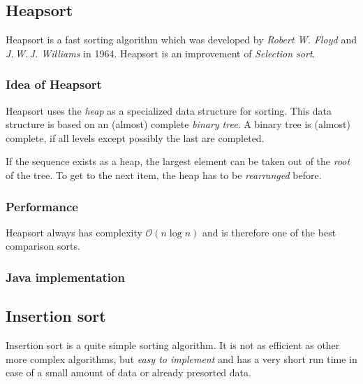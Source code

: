 \documentclass[]{pfBook}
\newcommand{\OO}{\mathcal{O}}
\begin{document}
	
	
	\subsection{Heapsort}
	
	Heapsort is a fast sorting algorithm which was developed by \emph{Robert W. Floyd} and \emph{J.\,W.\,J. Williams} in 1964. Heapsort is an improvement of \emph{Selection sort}.
	
	\subsubsection{Idea of Heapsort}
	
	Heapsort uses the \emph{heap} as a specialized data structure for sorting. This data structure is based on an (almost) complete \emph{binary tree}. A binary tree is (almost) complete, if all levels except possibly the last are completed.
	
	If the sequence exists as a heap, the largest element can be taken out of the \emph{root} of the tree. To get to the next item, the heap has to be \emph{rearranged} before.
	
	\subsubsection{Performance}
	
	Heapsort always has complexity $\OO(n \log n)$ and is therefore one of the best comparison sorts.
	
	\subsubsection{Java implementation}
	
	
	
	\subsection{Insertion sort}
	
	Insertion sort is a quite simple sorting algorithm. It is not as efficient as other more complex algorithms, but \emph{easy to implement} and has a very short run time in case of a small amount of data or already presorted data.
	
\end{document}
